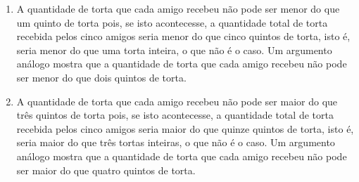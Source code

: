 \begin{atividade}
\begin{enumerate}
    \item A quantidade de torta que cada amigo recebeu não pode ser menor do que um quinto de torta pois, se isto acontecesse, a quantidade total de torta recebida pelos cinco amigos seria menor do que cinco quintos de torta, isto é, seria menor do que uma torta inteira, o que não é o caso. Um argumento análogo mostra que a quantidade de torta que cada amigo recebeu não pode ser menor do que dois quintos de torta.
    \item A quantidade de torta que cada amigo recebeu não pode ser maior do que três quintos de torta pois, se isto acontecesse, a quantidade total de torta recebida pelos cinco amigos seria maior do que quinze quintos de torta, isto é, seria maior do que três tortas inteiras, o que não é o caso. Um argumento análogo mostra que a quantidade de torta que cada amigo recebeu não pode ser maior do que quatro quintos de torta.
\end{enumerate} %

\end{atividade}

